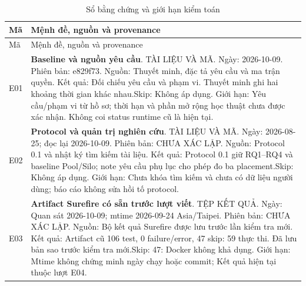 \begin{longtable}{@{}P{.11\textwidth}P{.79\textwidth}@{}}
\caption{Sổ bằng chứng và giới hạn kiểm toán}\label{tab:evidence-register}\\
\toprule Mã & Mệnh đề, nguồn và provenance \\
\midrule\endfirsthead
\toprule Mã & Mệnh đề, nguồn và provenance \\
\midrule\endhead
{}\label{ev:E01}E01 & \textbf{Baseline và nguồn yêu cầu}. TÀI LIỆU VÀ MÃ. \newline Ngày: 2026-10-09. Phiên bản: e829f73. \newline Nguồn: Thuyết minh, đặc tả yêu cầu và ma trận quyền. \newline Kết quả: Đối chiếu yêu cầu và phạm vi. Thuyết minh ghi hai khoảng thời gian khác nhau.\newline Skip: Không áp dụng. \newline Giới hạn: Yêu cầu\slash phạm vi từ hồ sơ; thời hạn và phần mở rộng học thuật chưa được xác nhận. Không coi status runtime cũ là hiện tại. \\
\label{ev:E02}E02 & \textbf{Protocol và quản trị nghiên cứu}. TÀI LIỆU VÀ MÃ. \newline Ngày: 2026-08-25; đọc lại 2026-10-09. Phiên bản: CHƯA XÁC LẬP. \newline Nguồn: Protocol 0.1 và nhật ký tìm kiếm tài liệu. \newline Kết quả: Protocol 0.1 giữ RQ1–RQ4 và baseline Pool\slash Silo; note yêu cầu phụ lục cho phép đo ba placement.\newline Skip: Không áp dụng. \newline Giới hạn: Chưa khóa tìm kiếm và chưa có dữ liệu người dùng; báo cáo không sửa hồi tố protocol. \\
\label{ev:E03}E03 & \textbf{Artifact Surefire có sẵn trước lượt viết}. TỆP KẾT QUẢ. \newline Ngày: Quan sát 2026-10-09; mtime 2026-09-24 Asia\slash Taipei. Phiên bản: CHƯA XÁC LẬP. \newline Nguồn: Bộ kết quả Surefire được lưu trước lần kiểm tra mới. \newline Kết quả: Artifact cũ 106 test, 0 failure\slash error, 47 skip: 59 thực thi. Đã lưu bản sao trước kiểm tra mới.\newline Skip: 47: Docker không khả dụng. \newline Giới hạn: Mtime không chứng minh ngày chạy hoặc commit; Kết quả hiện tại thuộc lượt E04. \\

\end{longtable}

